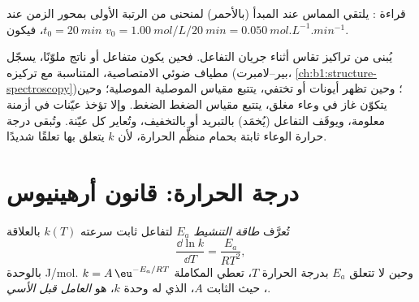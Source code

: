 \begin{omfigure}

{\small قراءة : يلتقي المماس عند المبدأ (بالأحمر) لمنحنى
من الرتبة الأولى بمحور الزمن عند $t_0 = \qty{20}{min}$، فيكون $v_0 =
\qty{1.00}{mol/L}/\qty{20}{min} = \qty{0.050}{mol.L^{-1}.min^{-1}}$.}
\end{omfigure}

\begin{inthelab}
يُبنى  من تراكيز تقاس أثناء جريان التفاعل.
فحين يكون متفاعل أو ناتج ملوّنًا، يسجّل مطياف ضوئي
الامتصاصية، المتناسبة مع تركيزه (بير--لامبرت،
\cref{ch:b1:structure-spectroscopy})؛ وحين تظهر أيونات أو تختفي،
يتتبع مقياس الموصلية الموصلية؛ وحين يتكوّن غاز في وعاء
مغلق، يتتبع مقياس الضغط الضغط. وإلا تؤخذ عيّنات في
أزمنة معلومة، ويوقَف التفاعل (يُخمَد) بالتبريد أو بالتخفيف،
وتُعاير كل عيّنة. وتُبقى درجة حرارة الوعاء
ثابتة بحمام منظَّم الحرارة، لأن $k$ يتعلق بها تعلقًا شديدًا.
\end{inthelab}

\section{درجة الحرارة: قانون أرهينيوس}

\begin{definition}\label{def:b1:rate-laws:activation-energy}
تُعرَّف \emph{طاقة التنشيط} $E_a$ لتفاعل
ثابت سرعته $k(T)$ بالعلاقة
\[
  \frac{\dd \ln k}{\dd T} = \frac{E_a}{RT^2} ,
\]
بالوحدة \unit{J/mol}. وحين لا تتعلق $E_a$ بدرجة الحرارة $T$، تعطي المكاملة
$k = A\,\eu^{-E_a/RT}$، حيث الثابت $A$، الذي له وحدة $k$، هو
\emph{العامل قبل الأسي}.
\end{definition}

